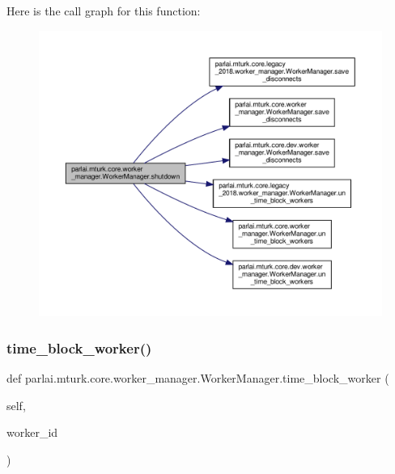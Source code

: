 Here is the call graph for this function\+:
\nopagebreak
\begin{figure}[H]
\begin{center}
\leavevmode
\includegraphics[width=350pt]{classparlai_1_1mturk_1_1core_1_1worker__manager_1_1WorkerManager_a814ac330b709eeef4abf4e4a73d71447_cgraph}
\end{center}
\end{figure}
\mbox{\label{classparlai_1_1mturk_1_1core_1_1worker__manager_1_1WorkerManager_a95b104ab69a0c75312657ce77842a690}} 
\subsubsection{\texorpdfstring{time\+\_\+block\+\_\+worker()}{time\_block\_worker()}}
{\footnotesize\ttfamily def parlai.\+mturk.\+core.\+worker\+\_\+manager.\+Worker\+Manager.\+time\+\_\+block\+\_\+worker (\begin{DoxyParamCaption}\item[{}]{self,  }\item[{}]{worker\+\_\+id }\end{DoxyParamCaption})}



